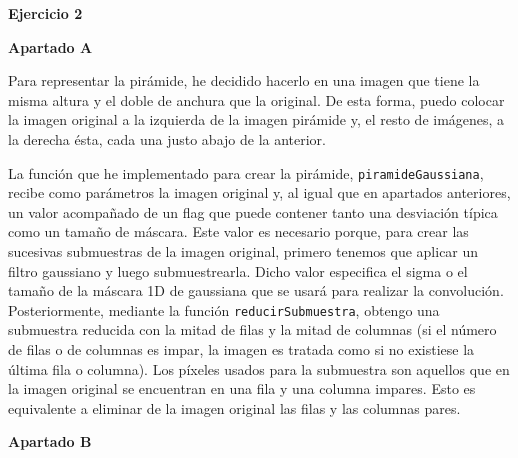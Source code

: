 \documentclass[10pt,a4paper]{article}
\begin{document}
\hfill \break
\hfill \break
\hfill \break
\hfill \break
\textbf{\huge Ejercicio 2}
\hfill \break
\begin{list}{•}{}
\item \textbf{\large Apartado A}

Para representar la pirámide, he decidido hacerlo en una imagen que tiene la misma altura y el doble de anchura que la original. De esta forma, puedo colocar la imagen original a la izquierda de la imagen pirámide y, el resto de imágenes, a la derecha ésta, cada una justo abajo de la anterior. 

La función que he implementado para crear la pirámide, \texttt{piramideGaussiana}, recibe como parámetros la imagen original y, al igual que en apartados anteriores, un valor acompañado de un flag que puede contener tanto una desviación típica como un tamaño de máscara. Este valor es necesario porque, para crear las sucesivas submuestras de la imagen original, primero tenemos que aplicar un filtro gaussiano y luego submuestrearla. Dicho valor especifica el sigma o el tamaño de la máscara 1D de gaussiana que se usará para realizar la convolución. Posteriormente, mediante la función \texttt{reducirSubmuestra}, obtengo una submuestra reducida con la mitad de filas y la mitad de columnas (si el número de filas o de columnas es impar, la imagen es tratada como si no existiese la última fila o columna). Los píxeles usados para la submuestra son aquellos que en la imagen original se encuentran en una fila y una columna impares. Esto es equivalente a eliminar de la imagen original las filas y las columnas pares.

\hfill \break




\item \textbf{\large Apartado B}


\end{list}
\end{document}
